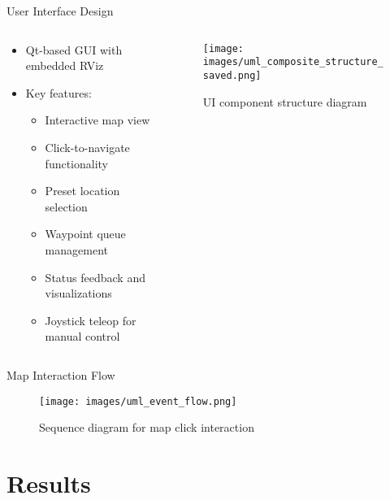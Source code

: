 \documentclass[aspectratio=169]{beamer}
\begin{document}
\begin{frame}{User Interface Design}
  \begin{columns}
    \begin{column}{0.5\textwidth}
      \begin{itemize}
      \item Qt-based GUI with embedded RViz
      \item Key features:
        \begin{itemize}
        \item Interactive map view
        \item Click-to-navigate functionality
        \item Preset location selection
        \item Waypoint queue management
        \item Status feedback and visualizations
        \item Joystick teleop for manual control
        \end{itemize}
      \end{itemize}
    \end{column}
    \begin{column}{0.5\textwidth}
      \begin{figure}
        \texttt{[image: images/uml\_composite\_structure\_saved.png]}
        \caption{UI component structure diagram}
      \end{figure}
    \end{column}
  \end{columns}
\end{frame}

\begin{frame}{Map Interaction Flow}
  \begin{figure}
    \centering
    \texttt{[image: images/uml\_event\_flow.png]}
    \caption{Sequence diagram for map click interaction}
  \end{figure}
\end{frame}

\section{Results}
\end{document}

